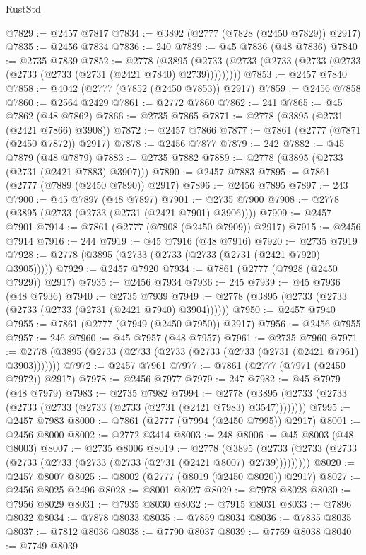 \begin{lexlean}{RustStd}
\begin{coremodule}
@7829 := @2457 @7817
@7834 := @3892 (@2777 (@7828 (@2450 @7829)) @2917)
@7835 := @2456 @7834
@7836 := 240
@7839 := @45 @7836 (@48 @7836)
@7840 := @2735 @7839
@7852 := @2778
    (@3895 (@2733 (@2733 (@2733 (@2733 (@2733 (@2733 (@2733 (@2731 (@2421 @7840) @2739)))))))))
@7853 := @2457 @7840
@7858 := @4042 (@2777 (@7852 (@2450 @7853)) @2917)
@7859 := @2456 @7858
@7860 := @2564 @2429
@7861 := @2772 @7860
@7862 := 241
@7865 := @45 @7862 (@48 @7862)
@7866 := @2735 @7865
@7871 := @2778 (@3895 (@2731 (@2421 @7866) @3908))
@7872 := @2457 @7866
@7877 := @7861 (@2777 (@7871 (@2450 @7872)) @2917)
@7878 := @2456 @7877
@7879 := 242
@7882 := @45 @7879 (@48 @7879)
@7883 := @2735 @7882
@7889 := @2778 (@3895 (@2733 (@2731 (@2421 @7883) @3907)))
@7890 := @2457 @7883
@7895 := @7861 (@2777 (@7889 (@2450 @7890)) @2917)
@7896 := @2456 @7895
@7897 := 243
@7900 := @45 @7897 (@48 @7897)
@7901 := @2735 @7900
@7908 := @2778 (@3895 (@2733 (@2733 (@2731 (@2421 @7901) @3906))))
@7909 := @2457 @7901
@7914 := @7861 (@2777 (@7908 (@2450 @7909)) @2917)
@7915 := @2456 @7914
@7916 := 244
@7919 := @45 @7916 (@48 @7916)
@7920 := @2735 @7919
@7928 := @2778 (@3895 (@2733 (@2733 (@2733 (@2731 (@2421 @7920) @3905)))))
@7929 := @2457 @7920
@7934 := @7861 (@2777 (@7928 (@2450 @7929)) @2917)
@7935 := @2456 @7934
@7936 := 245
@7939 := @45 @7936 (@48 @7936)
@7940 := @2735 @7939
@7949 := @2778 (@3895 (@2733 (@2733 (@2733 (@2733 (@2731 (@2421 @7940) @3904))))))
@7950 := @2457 @7940
@7955 := @7861 (@2777 (@7949 (@2450 @7950)) @2917)
@7956 := @2456 @7955
@7957 := 246
@7960 := @45 @7957 (@48 @7957)
@7961 := @2735 @7960
@7971 := @2778 (@3895 (@2733 (@2733 (@2733 (@2733 (@2733 (@2731 (@2421 @7961) @3903)))))))
@7972 := @2457 @7961
@7977 := @7861 (@2777 (@7971 (@2450 @7972)) @2917)
@7978 := @2456 @7977
@7979 := 247
@7982 := @45 @7979 (@48 @7979)
@7983 := @2735 @7982
@7994 := @2778 (@3895 (@2733 (@2733 (@2733 (@2733 (@2733 (@2733 (@2731 (@2421 @7983) @3547))))))))
@7995 := @2457 @7983
@8000 := @7861 (@2777 (@7994 (@2450 @7995)) @2917)
@8001 := @2456 @8000
@8002 := @2772 @3414
@8003 := 248
@8006 := @45 @8003 (@48 @8003)
@8007 := @2735 @8006
@8019 := @2778
    (@3895 (@2733 (@2733 (@2733 (@2733 (@2733 (@2733 (@2733 (@2731 (@2421 @8007) @2739)))))))))
@8020 := @2457 @8007
@8025 := @8002 (@2777 (@8019 (@2450 @8020)) @2917)
@8027 := @2456 @8025 @2496
@8028 := @8001 @8027
@8029 := @7978 @8028
@8030 := @7956 @8029
@8031 := @7935 @8030
@8032 := @7915 @8031
@8033 := @7896 @8032
@8034 := @7878 @8033
@8035 := @7859 @8034
@8036 := @7835 @8035
@8037 := @7812 @8036
@8038 := @7790 @8037
@8039 := @7769 @8038
@8040 := @7749 @8039

\end{coremodule}
\end{lexlean}
